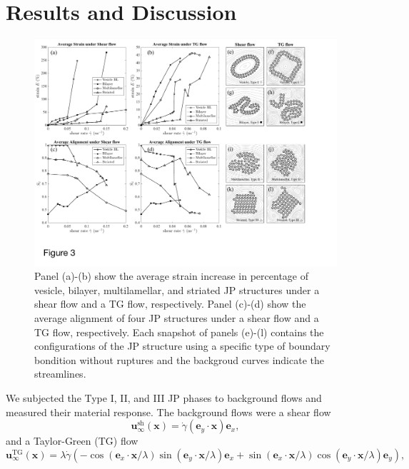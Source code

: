 \documentclass[prb,preprint,showpacs,preprintnumbers,amsmath,amssymb,longbibliography]{revtex4-1}
\newcommand{\ee}{\mathbf{e}}
\newcommand{\xx}{\mathbf{x}}
\newcommand{\uu}{\mathbf{u}}
\begin{document}
\section{Results and Discussion}
\label{sec:results}
\begin{figure}[t]
\begin{center}
\includegraphics[width=\textwidth]{S2ESummary.pdf}
\end{center}
\caption{\label{fig:s2esummary}
Panel (a)-(b) show the average strain increase in percentage of vesicle, bilayer, multilamellar, and striated JP structures under a shear flow and a TG flow, respectively.
Panel (c)-(d) show the average alignment of four JP structures under a shear flow and a TG flow, respectively. 
Each snapshot of panels (e)-(l) contains the configurations of the JP structure using a specific type of boundary bondition without ruptures and the backgroud curves indicate the streamlines.}
\end{figure}
%
We subjected the Type I, II, and III JP phases to background flows and measured 
their material response.  The background flows were a shear flow
\begin{equation}
\label{eq:sh_flow}
\uu_\infty^{\text{sh}}(\xx) = 
\dot\gamma (\ee_y \cdot \mathbf{x})\ee_x,
\end{equation}
and a Taylor-Green (TG) flow
\begin{equation}
\label{eq:tg_flow}
\uu_\infty^{\text{TG}}(\xx) = 
\lambda \dot \gamma \left(
-\cos(\ee_x\cdot\xx/\lambda)\sin(\ee_y\cdot\xx/\lambda)\ee_x
+\sin(\ee_x\cdot\xx/\lambda)\cos(\ee_y\cdot\xx/\lambda)\ee_y\right),
\end{equation}
\end{document}
